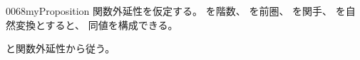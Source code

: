 \documentclass[index]{subfiles}
\begin{document}
\begin{myBlock}{0068}{myProposition}
  関数外延性を仮定する。
  を階数、
  を前圏、
  を関手、
  を自然変換とすると、
  同値を構成できる。
\end{myBlock}
\begin{myProof}
  と関数外延性から従う。
\end{myProof}
\end{document}
